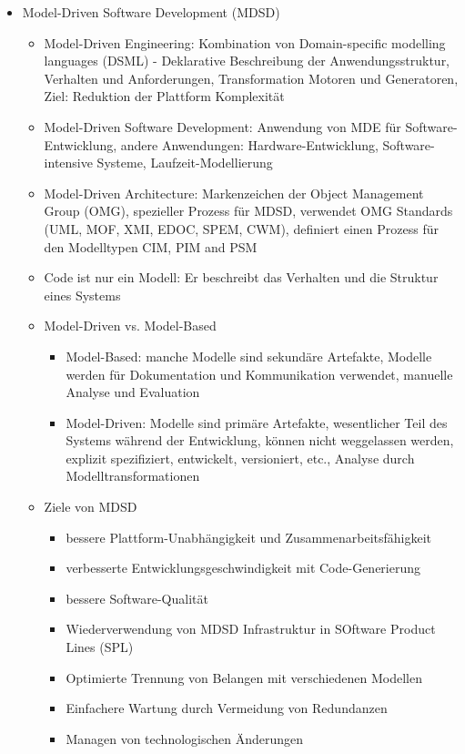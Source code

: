 \documentclass[paper=a4, fontsize=11pt]{scrartcl} %
\numberwithin{equation}{section} %
\numberwithin{figure}{section} %
\numberwithin{table}{section} %
\begin{document}
\begin{itemize}
\begin{itemize}
  \end{itemize}
  \item Model-Driven Software Development (MDSD)
  \begin{itemize}
    \item Model-Driven Engineering: Kombination von Domain-specific modelling languages (DSML) - Deklarative Beschreibung der Anwendungsstruktur, Verhalten und Anforderungen, Transformation Motoren und Generatoren, Ziel: Reduktion der Plattform Komplexität
    \item Model-Driven Software Development: Anwendung von MDE für Software-Entwicklung, andere Anwendungen: Hardware-Entwicklung, Software-intensive Systeme, Laufzeit-Modellierung
    \item Model-Driven Architecture: Markenzeichen der Object Management Group (OMG), spezieller Prozess für MDSD, verwendet OMG Standards (UML, MOF, XMI, EDOC, SPEM, CWM), definiert einen Prozess für den Modelltypen CIM, PIM and PSM
    \item Code ist nur ein Modell: Er beschreibt das Verhalten und die Struktur eines Systems
    \item Model-Driven vs. Model-Based
    \begin{itemize}
      \item Model-Based: manche Modelle sind sekundäre Artefakte, Modelle werden für Dokumentation und Kommunikation verwendet, manuelle Analyse und Evaluation
      \item Model-Driven: Modelle sind primäre Artefakte, wesentlicher Teil des Systems während der Entwicklung, können nicht weggelassen werden, explizit spezifiziert, entwickelt, versioniert, etc., Analyse durch Modelltransformationen
    \end{itemize}
    \item Ziele von MDSD
    \begin{itemize}
      \item bessere Plattform-Unabhängigkeit und Zusammenarbeitsfähigkeit
      \item verbesserte Entwicklungsgeschwindigkeit mit Code-Generierung
      \item bessere Software-Qualität
      \item Wiederverwendung von MDSD Infrastruktur in SOftware Product Lines (SPL)
      \item Optimierte Trennung von Belangen mit verschiedenen Modellen
      \item Einfachere Wartung durch Vermeidung von Redundanzen
      \item Managen von technologischen Änderungen

\end{itemize}
\end{itemize}
\end{itemize}
\end{document}
